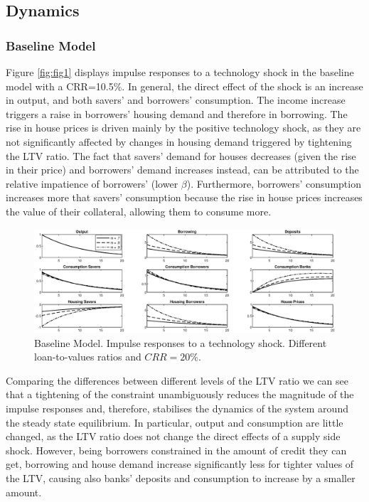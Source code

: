 \documentclass[final,3p,times,twocolumn]{elsarticle}
\begin{document}
  

 \subsection{Dynamics}
 
  \subsubsection{Baseline Model}
  
 Figure \ref{fig:fig1} displays impulse responses to a technology shock in the baseline model with a CRR=10.5\%. In general, the direct effect of the shock is an increase in output, and both savers' and borrowers' consumption. The income increase triggers a raise in borrowers’ housing demand and therefore in borrowing. The rise in house prices is driven mainly by the positive technology shock, as they are not significantly affected by changes in housing demand triggered by tightening the LTV ratio. The fact that savers’ demand for houses decreases (given the rise in their price) and borrowers’ demand increases instead, can be attributed to the relative impatience of borrowers’ (lower $\beta$). Furthermore, borrowers’ consumption increases more that savers’ consumption because the rise in house prices increases the value of their collateral, allowing them to consume more.\par


\begin{figure}[ht]
\centering
  \includegraphics[width=\linewidth]{fig2_rbc_crr_20.eps}
  \caption{Baseline Model. Impulse responses to a technology shock. Different loan-to-values ratios and $CRR=20\%$.}
    \label{fig:fig2}
\end{figure}


Comparing the differences between different levels of the LTV ratio we can see that a tightening of the constraint unambiguously reduces the magnitude of the impulse responses and, therefore, stabilises the dynamics of the system around the steady state equilibrium. In particular, output and consumption are little changed, as the LTV ratio does not change the direct effects of a supply side shock. However, being borrowers constrained in the amount of credit they can get, borrowing and house demand increase significantly less for tighter values of the LTV, causing also banks’ deposits and consumption to increase by a smaller amount.\par
\end{document}
